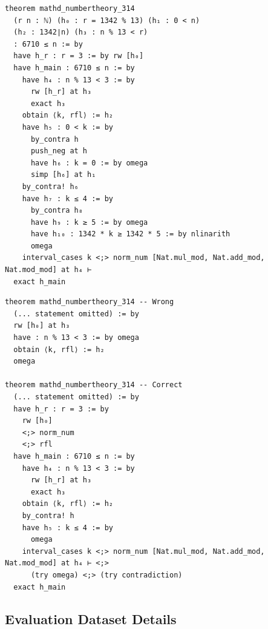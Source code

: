 \begin{tcolorbox}[colback=lightblue, boxrule=0pt, arc=5pt, outer arc=5pt, after skip=10pt plus 2pt]
\begin{minipage}[t]{0.48\textwidth}
\begin{lstlisting}[caption={Original Lean Proof (Length 126)},label={lst:proof-original}, language=lean, breaklines=true, style=mystyle]
theorem mathd_numbertheory_314
  (r n : ℕ) (h₀ : r = 1342 % 13) (h₁ : 0 < n)
  (h₂ : 1342∣n) (h₃ : n % 13 < r) 
  : 6710 ≤ n := by
  have h_r : r = 3 := by rw [h₀]
  have h_main : 6710 ≤ n := by
    have h₄ : n % 13 < 3 := by
      rw [h_r] at h₃
      exact h₃
    obtain ⟨k, rfl⟩ := h₂
    have h₅ : 0 < k := by
      by_contra h
      push_neg at h
      have h₆ : k = 0 := by omega
      simp [h₆] at h₁
    by_contra! h₆
    have h₇ : k ≤ 4 := by
      by_contra h₈
      have h₉ : k ≥ 5 := by omega
      have h₁₀ : 1342 * k ≥ 1342 * 5 := by nlinarith
      omega
    interval_cases k <;> norm_num [Nat.mul_mod, Nat.add_mod, Nat.mod_mod] at h₄ ⊢ 
  exact h_main
\end{lstlisting}
\end{minipage}\hfill
\begin{minipage}[t]{0.48\textwidth}
\begin{lstlisting}[caption={Wrong Simplification and Correct Repair (Length 93)},label={lst:proof-short}, language=lean, breaklines=true, style=mystyle]
theorem mathd_numbertheory_314 -- Wrong
  (... statement omitted) := by
  rw [h₀] at h₃
  have : n % 13 < 3 := by omega
  obtain ⟨k, rfl⟩ := h₂
  omega

theorem mathd_numbertheory_314 -- Correct
  (... statement omitted) := by
  have h_r : r = 3 := by
    rw [h₀]
    <;> norm_num
    <;> rfl
  have h_main : 6710 ≤ n := by
    have h₄ : n % 13 < 3 := by
      rw [h_r] at h₃
      exact h₃
    obtain ⟨k, rfl⟩ := h₂
    by_contra! h
    have h₅ : k ≤ 4 := by
      omega
    interval_cases k <;> norm_num [Nat.mul_mod, Nat.add_mod, Nat.mod_mod] at h₄ ⊢ <;>
      (try omega) <;> (try contradiction)
  exact h_main
\end{lstlisting}
\end{minipage}
\end{tcolorbox}

\newpage
\subsection{Evaluation Dataset Details} \label{appendix:evaluation-dataset-details}


